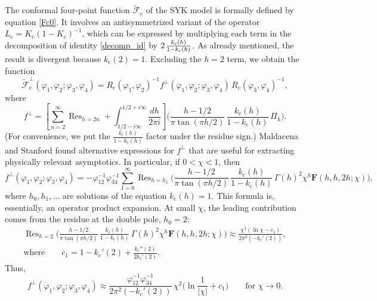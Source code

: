 \documentclass[12pt]{article}
\newcommand{\hgfs}{\mathbf{F}}
\newcommand{\calF}{\mathcal{F}}
\DeclareMathOperator{\Ress}{Res}
\newcommand{\cc}{\mathrm{c}}
\newcommand{\tF}{\widetilde{\calF}}
\newcommand{\vp}{\varphi}
\begin{document}
The conformal four-point function $\tF_{\cc}$ of the SYK model is formally defined by equation \eqref{Fc0}. It involves an antisymmetrized variant of the operator $L_{\cc}=K_{\cc}(1-K_{\cc})^{-1}$, which can be expressed by multiplying each term in the decomposition of identity \eqref{decomp_id} by $2\kern1pt\frac{k_{\cc}(h)}{1-k_{\cc}(h)}$. As already mentioned, the result is divergent because $k_{\cc}(2)=1$. Excluding the $h=2$ term, we obtain the function
\begin{equation} \label{tF_perp_c}
\tF^{\perp}_{\cc}(\vp_1,\vp_2;\vp_3,\vp_4)
=R_{\cc}(\vp_1,\vp_2)^{-1}
f^{\perp}(\vp_1,\vp_2;\vp_3,\vp_4)\,
R_{\cc}(\vp_3,\vp_4)^{-1},
\end{equation}
where
\begin{equation}\label{f_perp}
f^{\perp}=\left[\sum_{n=2}^{\infty}\Ress_{h=2n}
+\int_{1/2-i\infty}^{1/2+i\infty}\frac{dh}{2\pi i}\right]
\biggl(\frac{h-1/2}{\pi\tan(\pi h/2)}\,
\frac{k_{\cc}(h)}{1-k_{\cc}(h)}\,\Pi_h\biggr).
\end{equation}
(For convenience, we put the $\frac{k_{\cc}(h)}{1-k_{\cc}(h)}$ factor under the residue sign.) Maldacena and Stanford \cite{MS16} found alternative expressions for $f^{\perp}$ that are useful for extracting physically relevant asymptotics. In particular, if $0<\chi<1$, then
\begin{equation}\label{f_perp1}
f^{\perp}(\vp_1,\vp_2;\vp_3,\vp_4)
=-\vp_{12}^{-1}\vp_{34}^{-1}\sum_{I=0}^{\infty}\Ress_{h=h_I}
\biggl(\frac{h-1/2}{\pi\tan(\pi h/2)}\,\frac{k_{\cc}(h)}{1-k_{\cc}(h)}\,
\Gamma(h)^2\chi^h\hgfs(h,h,2h;\chi)\!\biggr),
\end{equation}
where $h_0,h_1,\ldots$ are solutions of the equation $k_{\cc}(h)=1$. This formula is, essentially, an operator product expansion. At small $\chi$, the leading contribution comes from the residue at the double pole, $h_0=2$:
\begin{gather}
\Ress_{h=2}
\biggl(\frac{h-1/2}{\pi\tan(\pi h/2)}\,\frac{k_{\cc}(h)}{1-k_{\cc}(h)}\,
\Gamma(h)^2\chi^h\hgfs(h,h,2h;\chi)\!\biggr)
\approx\frac{\chi^2(\ln\chi-c_1)}{2\pi^2(-k_{\cc}'(2))},
\\[5pt]
\text{where}\qquad
c_1=1-k_{\cc}'(2)+\frac{k_{\cc}''(2)}{2k_{\cc}'(2)}.
\end{gather}
Thus,
\begin{equation} \label{f_perp_asym}
f^{\perp}(\vp_1,\vp_2;\vp_3,\vp_4)
\approx\frac{\vp_{12}^{-1}\vp_{34}^{-1}}{2\pi^2(-k_{\cc}'(2))}\,
\chi^2\biggl(\ln\frac{1}{|\chi|}+c_1\biggr)\qquad
\text{for }\chi\to 0.
\end{equation}
\end{document}
